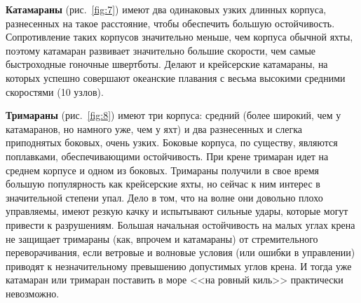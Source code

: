 \documentclass[a4paper, 12pt, twoside, final]{scrbook}
\begin{document}
\textbf{Катамараны} (рис.~\ref{fig:7})
имеют два одинаковых узких длинных корпуса, разнесенных на такое расстояние,
чтобы обеспечить большую остойчивость. Сопротивление таких корпусов
значительно меньше, чем корпуса обычной яхты, поэтому катамаран развивает
значительно большие скорости, чем самые быстроходные гоночные швертботы.
Делают и крейсерские катамараны, на которых успешно совершают океанские
плавания с весьма высокими средними скоростями (10 узлов).

\textbf{Тримараны} (рис.~\ref{fig:8})
имеют три корпуса: средний (более широкий, чем у катамаранов, но намного
уже, чем у яхт) и два разнесенных и слегка приподнятых боковых, очень
узких. Боковые корпуса, по существу, являются поплавками, обеспечивающими
остойчивость. При крене тримаран идет на среднем корпусе и одном из
боковых. Тримараны получили в свое время большую популярность как
крейсерские яхты, но сейчас к ним интерес в значительной степени упал.
Дело в том, что на волне они довольно плохо управляемы, имеют резкую
качку и испытывают сильные удары, которые могут привести к разрушениям.
Большая начальная остойчивость на малых углах крена не защищает тримараны
(как, впрочем и катамараны) от стремительного переворачивания, если
ветровые и волновые условия (или ошибки в управлении) приводят к незначительному
превышению допустимых углов крена. И тогда уже катамаран или тримаран
поставить в море <<на ровный киль>> практически невозможно.
\end{document}
